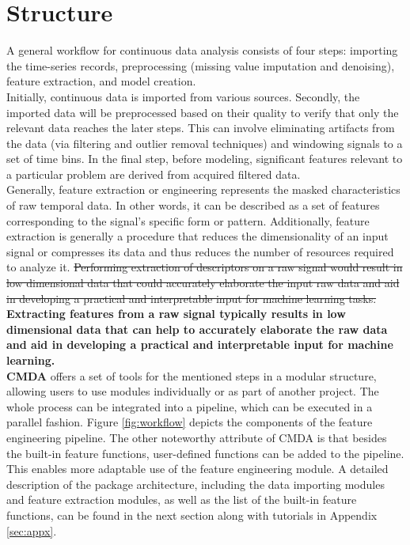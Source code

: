 \documentclass{article}
\begin{document}
\section{Structure}
A general workflow for continuous data analysis consists of four steps: importing the time-series records, preprocessing (missing value imputation and denoising), feature extraction, and model creation.\\
Initially, continuous data is imported from various sources. Secondly, the imported data will be preprocessed based on their quality to verify that only the relevant data reaches the later steps. This can involve eliminating artifacts from the data (via filtering and outlier removal techniques) and windowing signals to a set of time bins. In the final step, before modeling, significant features relevant to a particular problem are derived from acquired filtered data.\\
Generally, feature extraction or engineering represents the masked characteristics of raw temporal data. In other words, it can be described as a set of features corresponding to the signal's specific form or pattern. Additionally, feature extraction is generally a procedure that reduces the dimensionality of an input signal or compresses its data and thus reduces the number of resources required to analyze it. 
\st{Performing extraction of descriptors on a raw signal would result in low dimensional data that could accurately elaborate the input raw data and aid in developing a practical and interpretable input for machine learning tasks.}\todo{}
\textbf{Extracting features from a raw signal typically results in low dimensional data that can help to accurately elaborate the raw data and aid in developing a practical and interpretable input for machine learning.}\\ 
\textbf{CMDA} offers a set of tools for the mentioned steps in a modular structure, allowing users to use modules individually or as part of another project. The whole process can be integrated into a pipeline, which can be executed in a parallel fashion.
Figure \ref{fig:workflow} depicts the components of the feature engineering pipeline. The other noteworthy attribute of CMDA is that besides the built-in feature functions, user-defined functions can be added to the pipeline. This enables more adaptable use of the feature engineering module.
A detailed description of the package architecture, including the data importing modules and feature extraction modules, as well as the list of the built-in feature functions, can be found in the next section along with tutorials in Appendix \ref{sec:appx}.
\end{document}
